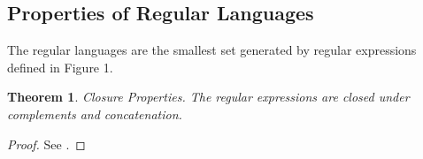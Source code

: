 \documentclass[10pt,preprint]{sigplanconf}
\newtheorem{thm}{Theorem}
\theoremstyle{definition}
\newtheorem{defn}[thm]{Definition}
\newcommand{\ifilter}[2]{ {\tt ifilter}(#1,#2) }
\newcommand{\istrf}[1]{`#1\textrm'} %
\newcommand{\lcs}{\lambda_{CS}}
\begin{document}
%
%
%
\subsection{Properties of Regular Languages}

The regular languages are the smallest set generated by regular expressions
defined in Figure 1.

\begin{thm}{Closure Properties.} \label{thm:closure}
The regular expressions are closed under complements and concatenation.
\end{thm}
\begin{proof}
See \cite{cinderella}.
\end{proof}
\end{document}
